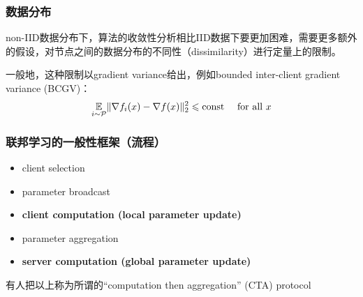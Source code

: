 
\begin{frame}
\frametitle{数据分布}

non-IID数据分布下，算法的收敛性分析相比IID数据下要更加困难，需要更多额外的假设，对节点之间的数据分布的不同性（dissimilarity）进行定量上的限制。

\vspace{1.5em}

一般地，这种限制以gradient variance给出，例如bounded inter-client gradient variance (BCGV)：
$$\operatorname*{\mathbb{E}}\limits_{i \sim {\mathcal{P}}} \lVert \nabla f_i(x) - \nabla f(x) \rVert_2^2 \leqslant \text{const} \quad \text{ for all } x$$

\end{frame}


\begin{frame}
\frametitle{联邦学习的一般性框架（流程）}

\begin{itemize}
    \item client selection
    \vspace{0.3em}
    \item {\color{red}parameter} broadcast
    \vspace{0.3em}
    \item {\large \bfseries client computation (local parameter update)}
    \vspace{0.3em}
    \item {\color{red}parameter} aggregation
    \vspace{0.3em}
    \item {\large \bfseries server computation (global parameter update)}
\end{itemize}

\vspace{0.6em}
有人\cite{zhang2020fedpd}把以上称为所谓的``computation then aggregation'' (CTA) protocol


\end{frame}



